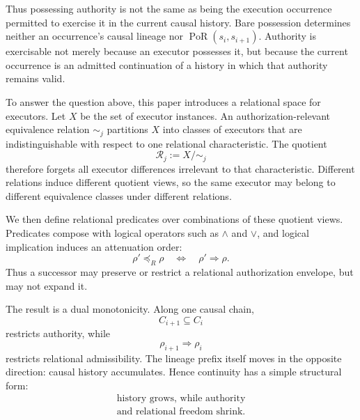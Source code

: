\documentclass[10pt,twocolumn]{article}
\newcommand{\Rel}{\mathcal{R}}
\newcommand{\PoR}{\operatorname{PoR}}
\begin{document}
Thus possessing authority is not the same as being the execution occurrence
permitted to exercise it in the current causal history. Bare possession
determines neither an occurrence's causal lineage nor
\(\PoR(s_i,s_{i+1})\).
Authority is exercisable not merely because an executor possesses it, but
because the current occurrence is an admitted continuation of a history in
which that authority remains valid.

To answer the question above, this paper introduces a relational space for
executors. Let \(X\) be the set of executor instances. An
authorization-relevant equivalence relation \(\sim_j\) partitions \(X\) into
classes of executors that are indistinguishable with respect to one relational
characteristic. The quotient
\[
\Rel_j := X/{\sim_j}
\]
therefore forgets all executor differences irrelevant to that characteristic.
Different relations induce different quotient views, so the same executor may
belong to different equivalence classes under different relations.

We then define relational predicates over combinations of these quotient views.
Predicates compose with logical operators such as \(\land\) and \(\lor\), and
logical implication induces an attenuation order:
\[
\rho' \preceq_R \rho
\quad\Longleftrightarrow\quad
\rho' \Rightarrow \rho.
\]
Thus a successor may preserve or restrict a relational authorization envelope,
but may not expand it.

The result is a dual monotonicity. Along one causal chain,
\[
C_{i+1}\subseteq C_i
\]
restricts authority, while
\[
\rho_{i+1}\Rightarrow\rho_i
\]
restricts relational admissibility. The lineage prefix itself moves in the
opposite direction: causal history accumulates. Hence continuity has a simple
structural form:
\[
\begin{gathered}
\text{history grows, while authority}\\
\text{and relational freedom shrink.}
\end{gathered}
\]
\end{document}
